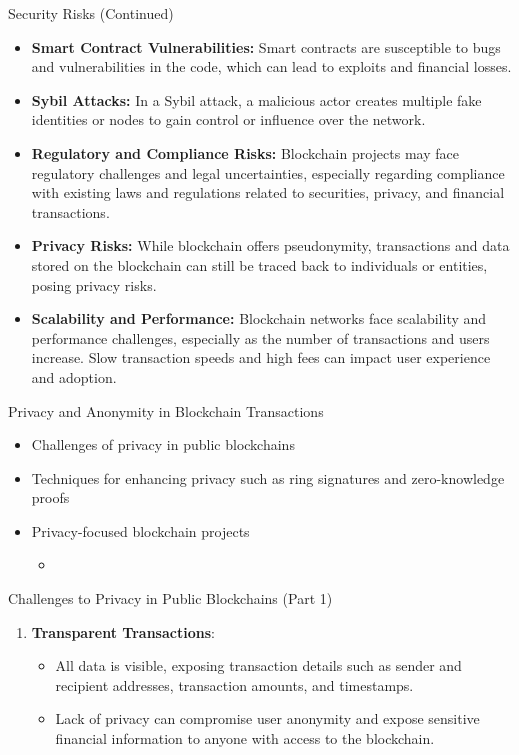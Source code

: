 \begin{withoutheadline}
\begin{frame}{Security Risks (Continued)}
    \begin{itemize}
    \item \textbf{Smart Contract Vulnerabilities:} Smart contracts are susceptible to bugs and vulnerabilities in the code, which can lead to exploits and financial losses.
    \item \textbf{Sybil Attacks:} In a Sybil attack, a malicious actor creates multiple fake identities or nodes to gain control or influence over the network.
    \item \textbf{Regulatory and Compliance Risks:} Blockchain projects may face regulatory challenges and legal uncertainties, especially regarding compliance with existing laws and regulations related to securities, privacy, and financial transactions.
    \item \textbf{Privacy Risks:} While blockchain offers pseudonymity, transactions and data stored on the blockchain can still be traced back to individuals or entities, posing privacy risks.
    \item \textbf{Scalability and Performance:} Blockchain networks face scalability and performance challenges, especially as the number of transactions and users increase. Slow transaction speeds and high fees can impact user experience and adoption.
    \end{itemize}
\end{frame}

\begin{frame}{Privacy and Anonymity in Blockchain Transactions}
    \begin{itemize}
        \item Challenges of privacy in public blockchains
        \item Techniques for enhancing privacy such as ring signatures and zero-knowledge proofs
        \item Privacy-focused blockchain projects
        \begin{itemize}
            \item 
        \end{itemize}
    \end{itemize}
\end{frame}

\begin{frame}{Challenges to Privacy in Public Blockchains (Part 1)}
    \begin{enumerate}
        \item \textbf{Transparent Transactions}:
            \begin{itemize}
                \item All data is visible, exposing transaction details such as sender and recipient addresses, transaction amounts, and timestamps.
                \item Lack of privacy can compromise user anonymity and expose sensitive financial information to anyone with access to the blockchain.
            \end{itemize}
        

\end{enumerate}
\end{frame}
\end{withoutheadline}
